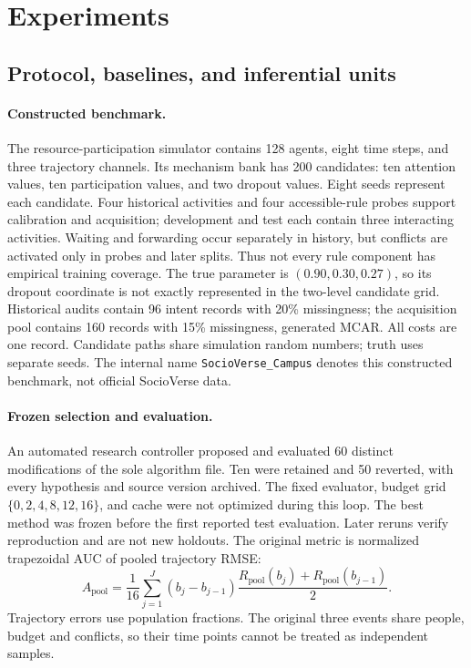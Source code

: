 \section{Experiments}
\label{sec:experiments}
\subsection{Protocol, baselines, and inferential units}
\paragraph{Constructed benchmark.}
The resource-participation simulator contains 128 agents, eight time steps, and three trajectory channels. Its mechanism bank has 200 candidates: ten attention values, ten participation values, and two dropout values. Eight seeds represent each candidate. Four historical activities and four accessible-rule probes support calibration and acquisition; development and test each contain three interacting activities. Waiting and forwarding occur separately in history, but conflicts are activated only in probes and later splits. Thus not every rule component has empirical training coverage. The true parameter is $(0.90,0.30,0.27)$, so its dropout coordinate is not exactly represented in the two-level candidate grid. Historical audits contain 96 intent records with 20\% missingness; the acquisition pool contains 160 records with 15\% missingness, generated MCAR. All costs are one record. Candidate paths share simulation random numbers; truth uses separate seeds. The internal name \texttt{SocioVerse\_Campus} denotes this constructed benchmark, not official SocioVerse data.

\paragraph{Frozen selection and evaluation.}
An automated research controller proposed and evaluated 60 distinct modifications of the sole algorithm file. Ten were retained and 50 reverted, with every hypothesis and source version archived. The fixed evaluator, budget grid $\{0,2,4,8,12,16\}$, and cache were not optimized during this loop. The best method was frozen before the first reported test evaluation. Later reruns verify reproduction and are not new holdouts. The original metric is normalized trapezoidal AUC of pooled trajectory RMSE:
\begin{equation}
 A_{\mathrm{pool}}=\frac1{16}\sum_{j=1}^{J}
 (b_j-b_{j-1})\frac{R_{\mathrm{pool}}(b_j)+R_{\mathrm{pool}}(b_{j-1})}{2}.
 \label{eq:auc}
\end{equation}
Trajectory errors use population fractions. The original three events share people, budget and conflicts, so their time points cannot be treated as independent samples.

